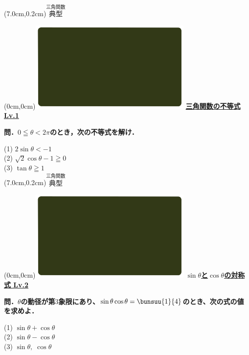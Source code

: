 \documentclass[10pt,
fleqn,
dvipdfmx,
uplatex
]{jsarticle}
\begin{document}
\at(7.0cm,0.2cm){\small\color{bradorange}$\overset{\text{三角関数}}{\text{典型}}$}

\newpage

\at(0cm,0cm){\includegraphics[width=8cm,bb=0 0 1920 1080]{./youtube/thumbnails/templates/smart_background/三角関数.jpeg}}
{\color{orange}\bf\boldmath\LARGE\underline{三角関数の不等式 Lv.1}}\vspace{0.3zw}

\normalsize
\bf\boldmath 問．$0\leqq \theta <2\pi$のとき，次の不等式を解け．

\LARGE
\vspace{-0.1zw}
(1)  $2\sin \theta <-1$\\
(2)  $\sqrt 2\cos \theta -1\geqq 0$\\
(3)  $\tan \theta \geqq 1$\\

\at(7.0cm,0.2cm){\small\color{bradorange}$\overset{\text{三角関数}}{\text{典型}}$}

\newpage

\at(0cm,0cm){\includegraphics[width=8cm,bb=0 0 1920 1080]{./youtube/thumbnails/templates/smart_background/三角関数.jpeg}}
{\color{orange}\bf\boldmath\Large\underline{$\sin \theta$と$\cos \theta$の対称式 Lv.2}}\vspace{0.1zw}

\normalsize 
\bf\boldmath 問．$\theta$の動径が第$3$象限にあり、$\sin \theta \cos \theta =\bunsuu{1}{4}$のとき、次の式の値を求めよ．

\Large
\vspace{-0.1zw}
(1)  $\sin \theta +\cos \theta$\vspace{-0.1zw}\\
(2)  $\sin \theta -\cos \theta$\vspace{-0.1zw}\\
(3)  $\sin \theta ,\;\cos \theta$\\
\end{document}

